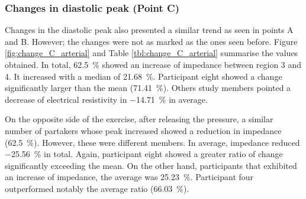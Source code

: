 \subsubsection{Changes in diastolic peak (Point C)}
\label{section results 3.2.3}
Changes in the diastolic peak also presented a similar trend as seen in points A and B. However; the changes were not as marked as the ones seen before. Figure \ref{fig:change_C_arterial} and Table \ref{tbl:change_C_arterial} summarise the values obtained. In total, \SI{62.5}{\percent} showed an increase of impedance between region 3 and 4. It increased with a median of \SI{21.68}{\percent}. Participant eight showed a change significantly larger than the mean (\SI{71.41}{\percent}). Others study members pointed a decrease of electrical resistivity in \SI{-14.71}{\percent} in average.  

On the opposite side of the exercise, after releasing the pressure, a similar number of partakers whose peak increased showed a reduction in impedance (\SI{62.5}{\percent}).  However, these were different members. In average, impedance reduced \SI{-25.56}{\percent} in total. Again, participant eight showed a greater ratio of change significantly exceeding the mean. On the other hand, participants that exhibited an increase of impedance, the average was \SI{25.23}{\percent}. Participant four outperformed notably the average ratio (\SI{66.03}{\percent}).

